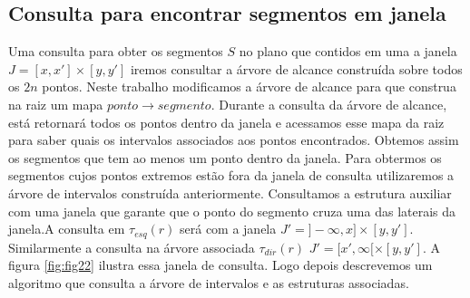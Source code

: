\subsection{Consulta para encontrar segmentos em janela}
Uma consulta para obter os segmentos $S$  no plano que contidos em uma a janela $J=[x,x']\times[y, y']$ iremos consultar a árvore de alcance construída sobre todos os $2n$ pontos. Neste trabalho modificamos a árvore de alcance para que construa na raiz um mapa $ponto \rightarrow segmento$. Durante a consulta da árvore de alcance, está retornará todos os pontos dentro da janela e acessamos esse mapa da raiz para saber quais os intervalos associados aos pontos encontrados. Obtemos assim os segmentos que tem ao menos um ponto dentro da janela.
Para obtermos os segmentos cujos pontos extremos estão fora da janela de consulta utilizaremos a árvore de intervalos construída anteriormente.  Consultamos a estrutura auxiliar com uma janela que garante que o ponto do segmento cruza uma das laterais da janela.A consulta em $\tau_{esq}(r)$ será com a janela $J'=]-\infty, x] \times [y, y']$. Similarmente a consulta na árvore associada $\tau_{dir}(r)$  $J'=[x', \infty[ \times [y, y']$. A figura \ref{fig:fig22} ilustra essa janela de consulta. Logo depois descrevemos um algoritmo que consulta a árvore de intervalos e as estruturas associadas.

